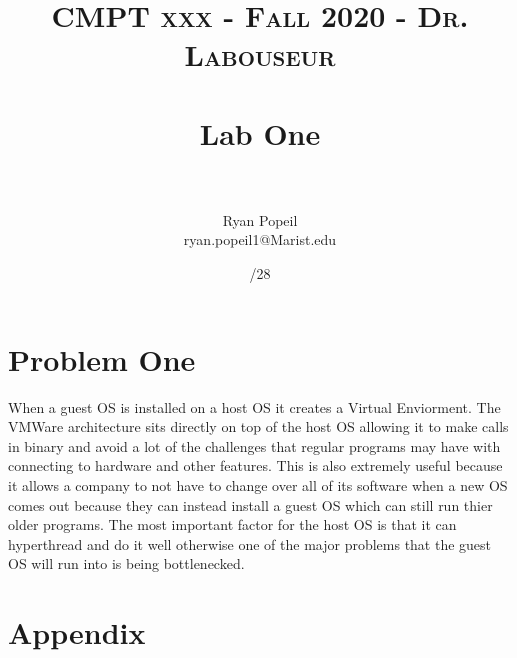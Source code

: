\documentclass[letterpaper, 10pt,DIV=13]{scrartcl}
\title{	
   \normalfont \normalsize 
   \textsc{CMPT xxx - Fall 2020 - Dr. Labouseur} \\[10pt] %
   \horrule{0.5pt} \\[0.25cm] 	%
   \huge Lab One  \\     	    %
   \horrule{0.5pt} \\[0.25cm] 	%
}
\author{Ryan Popeil \\ \normalsize ryan.popeil1@Marist.edu}
\date{\normalsize\9/28} 	%
\numberwithin{equation}{section} %
\numberwithin{figure}{section} %
\numberwithin{table}{section} %
\begin{document}
\maketitle %

\section{Problem One}
When a guest OS is installed on a host OS it creates a Virtual Enviorment.  The VMWare architecture sits directly on top of the 
host OS allowing it to make calls in binary and avoid a lot of the challenges that regular programs may have with connecting to hardware and other features.
This is also extremely useful because it allows a company to not have to change over all of its software when a new OS comes out because they can instead
install a guest OS which can still run thier older programs.  The most important factor for the host OS is that it can hyperthread and do it well otherwise one of 
the major problems that the guest OS will run into is being bottlenecked.


\pagebreak




 

\pagebreak


\section{Appendix}
\end{document}
